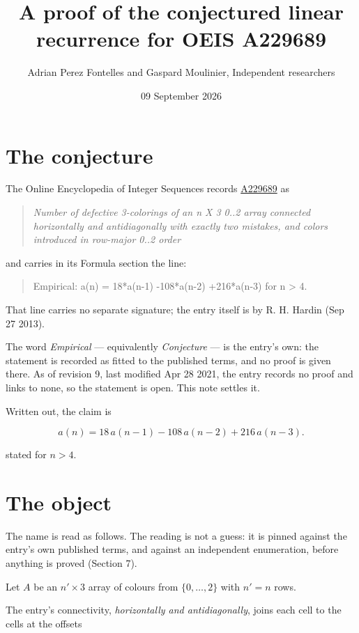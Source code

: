 \documentclass[11pt]{article}
\title{A proof of the conjectured linear recurrence for OEIS A229689}
\author{Adrian Perez Fontelles and Gaspard Moulinier, Independent researchers}
\date{09 September 2026}
\theoremstyle{definition}
\begin{document}
\maketitle
\section{The conjecture}

The Online Encyclopedia of Integer Sequences records \href{https://oeis.org/A229689}{A229689} as

\begin{quote}\itshape Number of defective 3-colorings of an n X 3 0..2 array connected horizontally and antidiagonally with exactly two mistakes, and colors introduced in row-major 0..2 order\end{quote}

and carries in its Formula section the line:

\begin{quote}\ttfamily Empirical: a(n) = 18*a(n-1) -108*a(n-2) +216*a(n-3) for n > 4.\end{quote}

That line carries no separate signature; the entry itself is by R. H. Hardin (Sep 27 2013).

The word {\itshape Empirical} --- equivalently {\itshape Conjecture} --- is the entry's own: the statement is recorded as fitted to the published terms, and no proof is given there. As of revision 9, last modified Apr 28 2021, the entry records no proof and links to none, so the statement is open. This note settles it.

Written out, the claim is

\[a(n) = 18\,a(n-1) - 108\,a(n-2) + 216\,a(n-3).\]

stated for $n > 4$.

\section{The object}

The name is read as follows. The reading is not a guess: it is pinned against the entry's own published terms, and against an independent enumeration, before anything is proved (Section 7).

Let $A$ be an $n' \times 3$ array of colours from $\{0,\dots,2\}$ with $n' = n$ rows.

The entry's connectivity, {\itshape horizontally and antidiagonally}, joins each cell to the cells at the offsets
\end{document}
